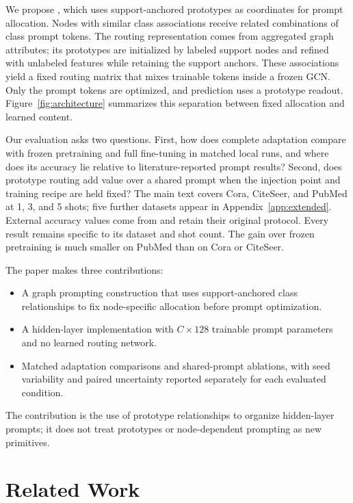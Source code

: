 We propose \method{}, which uses support-anchored prototypes as coordinates for prompt allocation. Nodes with similar class associations receive related combinations of class prompt tokens. The routing representation comes from aggregated graph attributes; its prototypes are initialized by labeled support nodes and refined with unlabeled features while retaining the support anchors. These associations yield a fixed routing matrix that mixes trainable tokens inside a frozen GCN. Only the prompt tokens are optimized, and prediction uses a prototype readout. Figure~\ref{fig:architecture} summarizes this separation between fixed allocation and learned content.

Our evaluation asks two questions. First, how does complete adaptation compare with frozen pretraining and full fine-tuning in matched local runs, and where does its accuracy lie relative to literature-reported prompt results? Second, does prototype routing add value over a shared prompt when the injection point and training recipe are held fixed? The main text covers Cora, CiteSeer, and PubMed at 1, 3, and 5 shots; five further datasets appear in Appendix~\ref{app:extended}. External accuracy values come from \citet{mtg2026} and retain their original protocol. Every result remains specific to its dataset and shot count. The gain over frozen pretraining is much smaller on PubMed than on Cora or CiteSeer.

The paper makes three contributions:
\begin{itemize}
\item A graph prompting construction that uses support-anchored class relationships to fix node-specific allocation before prompt optimization.
\item A hidden-layer implementation with $C\times128$ trainable prompt parameters and no learned routing network.
\item Matched adaptation comparisons and shared-prompt ablations, with seed variability and paired uncertainty reported separately for each evaluated condition.
\end{itemize}
The contribution is the use of prototype relationships to organize hidden-layer prompts; it does not treat prototypes or node-dependent prompting as new primitives.

\section{Related Work}
